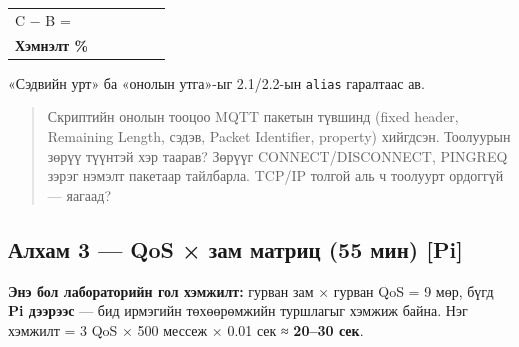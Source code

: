 \begin{longtable}[]{@{}llllll@{}}
\begin{minipage}[t]{0.14\columnwidth}
C − B =\strut
\end{minipage} & \begin{minipage}[t]{0.14\columnwidth}\raggedright
\strut
\end{minipage} & \begin{minipage}[t]{0.14\columnwidth}\raggedright
\strut
\end{minipage}\tabularnewline
\begin{minipage}[t]{0.14\columnwidth}\raggedright
\textbf{Хэмнэлт \%}\strut
\end{minipage} & \begin{minipage}[t]{0.14\columnwidth}\raggedright
\strut
\end{minipage} & \begin{minipage}[t]{0.14\columnwidth}\raggedright
\strut
\end{minipage} & \begin{minipage}[t]{0.14\columnwidth}\raggedright
\strut
\end{minipage} & \begin{minipage}[t]{0.14\columnwidth}\raggedright
\strut
\end{minipage} & \begin{minipage}[t]{0.14\columnwidth}\raggedright
\strut
\end{minipage}\tabularnewline
\bottomrule
\end{longtable}\endgroup

«Сэдвийн урт» ба «онолын утга»-ыг 2.1/2.2-ын \texttt{alias} гаралтаас ав.

\begin{quote}
Скриптийн онолын тооцоо MQTT пакетын түвшинд (fixed header, Remaining Length, сэдэв, Packet Identifier, property) хийгдсэн. Тоолуурын зөрүү түүнтэй хэр таарав? Зөрүүг CONNECT/DISCONNECT, PINGREQ зэрэг нэмэлт пакетаар тайлбарла. TCP/IP толгой аль ч тоолуурт ордоггүй --- яагаад?
\end{quote}

\hypertarget{ux430ux43bux445ux430ux43c-3-qos-ux437ux430ux43c-ux43cux430ux442ux440ux438ux446-55-ux43cux438ux43d-pi}{%
\subsection{Алхам 3 --- QoS × зам матриц (55 мин) {[}Pi{]}}\label{ux430ux43bux445ux430ux43c-3-qos-ux437ux430ux43c-ux43cux430ux442ux440ux438ux446-55-ux43cux438ux43d-pi}}

\textbf{Энэ бол лабораторийн гол хэмжилт:} гурван зам × гурван QoS = 9 мөр, бүгд \textbf{Pi дээрээс} --- бид ирмэгийн төхөөрөмжийн туршлагыг хэмжиж байна. Нэг хэмжилт = 3 QoS × 500 мессеж × 0.01 сек ≈ \textbf{20--30 сек}.

